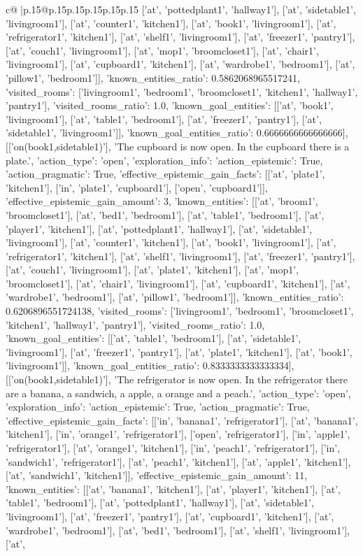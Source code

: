 \documentclass{article}
\begin{document}
{\begin{supertabular}{c@{$\;$}|p{.15\linewidth}@{}p{.15\linewidth}p{.15\linewidth}p{.15\linewidth}p{.15\linewidth}p{.15\linewidth}}
{{{['at', 'pottedplant1', 'hallway1'], ['at', 'sidetable1', 'livingroom1'], ['at', 'counter1', 'kitchen1'], ['at', 'book1', 'livingroom1'], ['at', 'refrigerator1', 'kitchen1'], ['at', 'shelf1', 'livingroom1'], ['at', 'freezer1', 'pantry1'], ['at', 'couch1', 'livingroom1'], ['at', 'mop1', 'broomcloset1'], ['at', 'chair1', 'livingroom1'], ['at', 'cupboard1', 'kitchen1'], ['at', 'wardrobe1', 'bedroom1'], ['at', 'pillow1', 'bedroom1']], 'known_entities_ratio': 0.5862068965517241, 'visited_rooms': ['livingroom1', 'bedroom1', 'broomcloset1', 'kitchen1', 'hallway1', 'pantry1'], 'visited_rooms_ratio': 1.0, 'known_goal_entities': [['at', 'book1', 'livingroom1'], ['at', 'table1', 'bedroom1'], ['at', 'freezer1', 'pantry1'], ['at', 'sidetable1', 'livingroom1']], 'known_goal_entities_ratio': 0.6666666666666666}}], [['on(book1,sidetable1)'], 'The cupboard is now open. In the cupboard there is a plate.', {'action_type': 'open', 'exploration_info': {'action_epistemic': True, 'action_pragmatic': True, 'effective_epistemic_gain_facts': [['at', 'plate1', 'kitchen1'], ['in', 'plate1', 'cupboard1'], ['open', 'cupboard1']], 'effective_epistemic_gain_amount': 3, 'known_entities': [['at', 'broom1', 'broomcloset1'], ['at', 'bed1', 'bedroom1'], ['at', 'table1', 'bedroom1'], ['at', 'player1', 'kitchen1'], ['at', 'pottedplant1', 'hallway1'], ['at', 'sidetable1', 'livingroom1'], ['at', 'counter1', 'kitchen1'], ['at', 'book1', 'livingroom1'], ['at', 'refrigerator1', 'kitchen1'], ['at', 'shelf1', 'livingroom1'], ['at', 'freezer1', 'pantry1'], ['at', 'couch1', 'livingroom1'], ['at', 'plate1', 'kitchen1'], ['at', 'mop1', 'broomcloset1'], ['at', 'chair1', 'livingroom1'], ['at', 'cupboard1', 'kitchen1'], ['at', 'wardrobe1', 'bedroom1'], ['at', 'pillow1', 'bedroom1']], 'known_entities_ratio': 0.6206896551724138, 'visited_rooms': ['livingroom1', 'bedroom1', 'broomcloset1', 'kitchen1', 'hallway1', 'pantry1'], 'visited_rooms_ratio': 1.0, 'known_goal_entities': [['at', 'table1', 'bedroom1'], ['at', 'sidetable1', 'livingroom1'], ['at', 'freezer1', 'pantry1'], ['at', 'plate1', 'kitchen1'], ['at', 'book1', 'livingroom1']], 'known_goal_entities_ratio': 0.8333333333333334}}], [['on(book1,sidetable1)'], 'The refrigerator is now open. In the refrigerator there are a banana, a sandwich, a apple, a orange and a peach.', {'action_type': 'open', 'exploration_info': {'action_epistemic': True, 'action_pragmatic': True, 'effective_epistemic_gain_facts': [['in', 'banana1', 'refrigerator1'], ['at', 'banana1', 'kitchen1'], ['in', 'orange1', 'refrigerator1'], ['open', 'refrigerator1'], ['in', 'apple1', 'refrigerator1'], ['at', 'orange1', 'kitchen1'], ['in', 'peach1', 'refrigerator1'], ['in', 'sandwich1', 'refrigerator1'], ['at', 'peach1', 'kitchen1'], ['at', 'apple1', 'kitchen1'], ['at', 'sandwich1', 'kitchen1']], 'effective_epistemic_gain_amount': 11, 'known_entities': [['at', 'banana1', 'kitchen1'], ['at', 'player1', 'kitchen1'], ['at', 'table1', 'bedroom1'], ['at', 'pottedplant1', 'hallway1'], ['at', 'sidetable1', 'livingroom1'], ['at', 'freezer1', 'pantry1'], ['at', 'cupboard1', 'kitchen1'], ['at', 'wardrobe1', 'bedroom1'], ['at', 'bed1', 'bedroom1'], ['at', 'shelf1', 'livingroom1'], ['at', }}}
\end{supertabular}}
\end{document}
